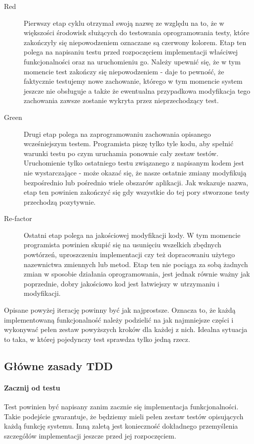     \begin{description}
      \item[Red] Pierwszy etap cyklu otrzymał swoją nazwę ze względu na to, że w większości środowisk służących do testowania oprogramowania testy, które zakończyły się niepowodzeniem oznaczane są czerwony kolorem. Etap ten polega na napisaniu testu przed rozpoczęciem implementacji właściwej funkcjonalności oraz na uruchomieniu go. Należy upewnić się, że w tym momencie test zakończy się niepowodzeniem - daje to pewność, że faktycznie testujemy nowe zachowanie, którego w tym momencie system jeszcze nie obsługuje a także że ewentualna przypadkowa modyfikacja tego zachowania zawsze zostanie wykryta przez nieprzechodzący test.
      \item[Green] Drugi etap polega na zaprogramowaniu zachowania opisanego wcześniejszym testem. Programista piszę tylko tyle kodu, aby spełnić warunki testu po czym uruchamia ponownie cały zestaw testów. Uruchomienie tylko ostatniego testu związanego z napisanym kodem jest nie wystarczające - może okazać się, że nasze ostatnie zmiany modyfikują bezpośrednio lub pośrednio wiele obszarów aplikacji. Jak wskazuje nazwa, etap ten powinien zakończyć się gdy wszystkie do tej pory stworzone testy przechodzą pozytywnie.
      \item[Re-factor] Ostatni etap polega na jakościowej modyfikacji kody. W tym momencie programista powinien skupić się na usunięciu wszelkich zbędnych powtórzeń, uproszczeniu implementacji czy też dopracowaniu użytego nazewnictwa zmiennych lub metod. Etap ten nie pociąga za sobą żadnych zmian w sposobie działania oprogramowania, jest jednak równie ważny jak poprzednie, dobry jakościowo kod jest łatwiejszy w utrzymaniu i modyfikacji.
    \end{description}
    
    Opisane powyżej iterację powinny być jak najprostsze. Oznacza to, że każdą implementowaną funkcjonalność należy podzielić na jak najmniejsze części i wykonywać pełen zestaw powyższych kroków dla każdej z nich. Idealna sytuacja to taka, w której pojedynczy test sprawdza tylko jedną rzecz.

  \subsection{Główne zasady TDD}
    \paragraph{Zacznij od testu}
      Test powinien być napisany zanim zacznie się implementacja funkcjonalności. Takie podejście gwarantuje, że będziemy mieli pełen zestaw testów opisujących każdą funkcję systemu. Inną zaletą jest konieczność dokładnego przemyślenia szczegółów implementacji jeszcze przed jej rozpoczęciem.
